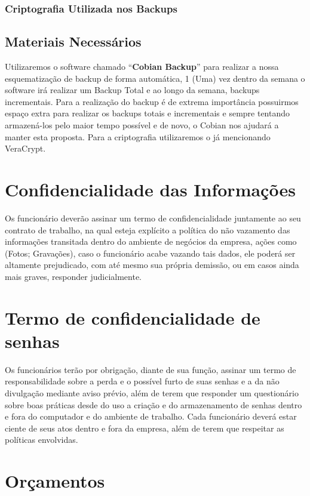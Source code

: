 \documentclass[12pt]{article}
\begin{document}
\subsubsection{Criptografia Utilizada nos Backups}

\subsection{Materiais Necessários}
Utilizaremos o software chamado “\textbf{Cobian Backup}” para realizar a nossa esquematização de backup de forma automática, 1 (Uma) vez dentro da semana o software irá realizar um Backup Total e ao longo da semana, backups incrementais. Para a realização do backup é de extrema importância possuirmos espaço extra para realizar os backups totais e incrementais e sempre tentando armazená-los pelo maior tempo possível e de novo, o Cobian nos ajudará a manter esta proposta. 
Para a criptografia utilizaremos o já mencionando VeraCrypt.

\section{Confidencialidade das Informações}
Os funcionário deverão assinar um termo de confidencialidade juntamente ao seu contrato de trabalho, na qual esteja explícito a política do não vazamento das informações transitada dentro do ambiente de negócios da empresa, ações como (Fotos; Gravações), caso o funcionário acabe vazando tais dados, ele poderá ser altamente prejudicado, com até mesmo sua própria demissão, ou em casos ainda mais graves, responder judicialmente.

\section{Termo de confidencialidade de senhas}
Os funcionários terão por obrigação, diante de sua função, assinar um termo de responsabilidade sobre a perda e o possível furto de suas senhas e a da não divulgação mediante aviso prévio, além de terem que responder um questionário sobre boas práticas desde do uso a criação e do armazenamento de senhas dentro e fora do computador e do ambiente de trabalho. Cada funcionário deverá estar ciente de seus atos dentro e fora da empresa, além de terem que respeitar as políticas envolvidas.

\section{Orçamentos}
\end{document}
